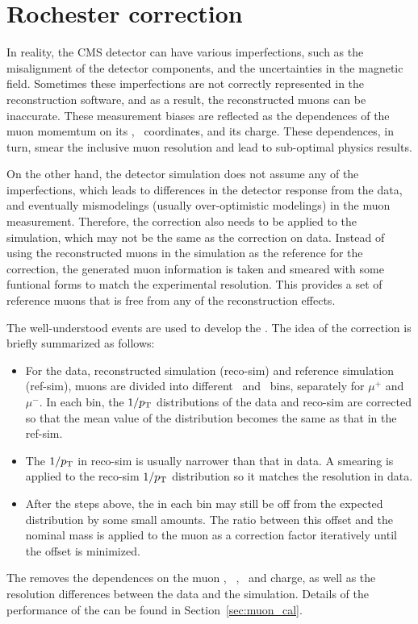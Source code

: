 \section{Rochester correction} \label{sec:Roch_corr}

In reality, the CMS detector can have various imperfections, 
such as the misalignment of the detector components, and the uncertainties in the magnetic field.
Sometimes these imperfections are not correctly represented in the reconstruction software, 
and as a result, the reconstructed muons can be inaccurate.
These measurement biases are reflected as the dependences of the muon momemtum on its \eta, \phi ~coordinates, and its charge.
These dependences, in turn, smear the inclusive muon resolution and lead to sub-optimal physics results.

On the other hand, the detector simulation does not assume any of the imperfections,
which leads to differences in the detector response from the data, and eventually mismodelings (usually over-optimistic modelings) in the muon measurement. 
Therefore, the correction also needs to be applied to the simulation, which may not be the same as the correction on data.
Instead of using the reconstructed muons in the simulation as the reference for the correction,
the generated muon information is taken and smeared with some funtional forms to match the experimental resolution.
This provides a set of reference muons that is free from any of the reconstruction effects. 

The well-understood \zmm events are used to develop the \RochCorr. 
The idea of the correction is briefly summarized as follows:
\begin{itemize}
  \item For the data, reconstructed simulation (reco-sim) and reference simulation (ref-sim), 
        muons are divided into different \eta ~and \phi ~bins, separately for $\mu^{+}$ and $\mu^{-}$.
        In each bin, the $1/p_{\mathrm{T}}$ distributions of the data and reco-sim are corrected so that the mean value of the distribution becomes the same as that in the ref-sim.
  \item The $1/p_{\mathrm{T}}$ in reco-sim is usually narrower than that in data. 
        A smearing is applied to the reco-sim $1/p_{\mathrm{T}}$ distribution so it matches the resolution in data.
  \item After the steps above, the \mmm in each bin may still be off from the expected distribution by some small amounts.
        The ratio between this offset and the nominal \PZ mass is applied to the muon \pt as a correction factor iteratively until the offset is minimized.
\end{itemize}
The \RochCorr removes the \mmm dependences on the muon \eta,~ \phi,~ and charge, 
as well as the \mmm resolution differences between the data and the simulation.
Details of the performance of the \RochCorr can be found in Section~\ref{sec:muon_cal}.


